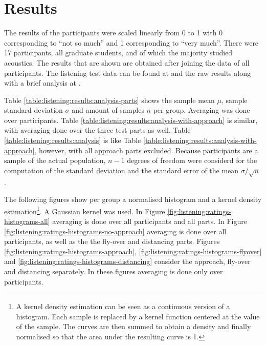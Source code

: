 \newpage
\section{Results}
The results of the participants were scaled linearly from 0 to 1 with 0
corresponding to ``not so much'' and 1 corresponding to ``very much''.
There were 17 participants, all graduate students, and of which the majority
studied acoustics. The results that are shown are obtained after joining the
data of all participants. %
The listening test data can be found at \cite{Rietdijk2017a} and the
raw results along with a brief analysis at \cite{Rietdijk2017b}.

Table \ref{table:listening:results:analysis-parts} shows the sample mean $\mu$,
sample standard deviation $\sigma$ and amount of samples $n$ per group. Averaging was
done over participants. Table
\ref{table:listening:results:analysis-with-approach} is similar, with averaging
done over the three test parts as well. Table
\ref{table:listening:results:analysis} is like Table
\ref{table:listening:results:analysis-with-approach}, however, with all approach
parts excluded. Because participants are a sample of the actual
population, $n-1$ degrees of freedom were considerd for the computation of the
standard deviation and the standard error of the mean $\sigma/\sqrt{n}$.

The following figures show per group a normalised histogram and a kernel density estimation\footnote{ A kernel density estimation can be seen as a continuous version
of a histogram. Each sample is replaced by a kernel function centered at the
value of the sample. The curves are then summed to obtain a density and finally
normalised so that the area under the resulting curve is 1. }. A Gaussian kernel
was used.
In Figure \ref{fig:listening:ratings-histograms-all} averaging is done over all participants and all parts.
In Figure \ref{fig:listening:ratings-histograms-no-approach} averaging is done over all participants, as well as the the fly-over and distancing parts.
Figures \ref{fig:listening:ratings-histograms-approach}, \ref{fig:listening:ratings-histograms-flyover} and \ref{fig:listening:ratings-histograms-distancing}
consider the approach, fly-over and distancing separately. In these figures averaging is done only over participants.

